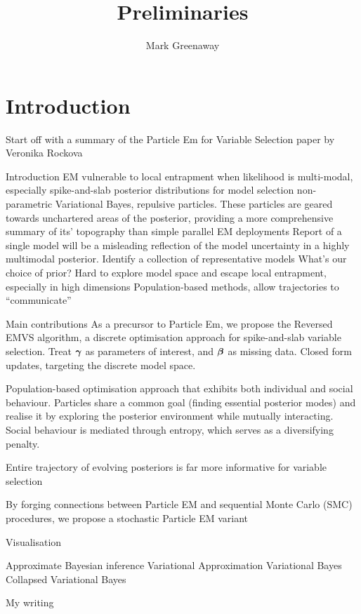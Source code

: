 \documentclass{amsart}[12pt]
\title{Preliminaries}
\author{Mark Greenaway}
\begin{document}
\setlength{\parindent}{0pt}
\maketitle

\section{Introduction}

Start off with a summary of the Particle Em for Variable Selection paper by Veronika Rockova

Introduction
EM vulnerable to local entrapment when likelihood is multi-modal, especially spike-and-slab posterior
distributions for model selection
non-parametric Variational Bayes, repulsive particles. These particles are geared towards unchartered areas of
the posterior, providing a more comprehensive summary of its' topography than simple parallel EM deployments
Report of a single model will be a misleading reflection of the model uncertainty in a highly multimodal
posterior. Identify a collection of representative models
What's our choice of prior?
Hard to explore model space and escape local entrapment, especially in high dimensions
Population-based methods, allow trajectories to ``communicate''

Main contributions
As a precursor to Particle Em, we propose the Reversed EMVS algorithm, a discrete optimisation approach for
spike-and-slab variable selection. Treat ${\boldsymbol \gamma}$ as parameters of interest, and ${\boldsymbol \beta}$ as missing data.
Closed form updates, targeting the discrete model space.

Population-based optimisation approach that exhibits both individual and social behaviour. Particles share a
common goal (finding essential posterior modes) and realise it by exploring the posterior environment while
mutually interacting. Social behaviour is mediated through entropy, which serves as a diversifying penalty.

Entire trajectory of evolving posteriors is far more informative for variable selection

By forging connections between Particle EM and sequential Monte Carlo (SMC) procedures, we propose a
stochastic Particle EM variant

Visualisation

Approximate Bayesian inference
Variational Approximation
Variational Bayes
Collapsed Variational Bayes

My writing
\end{document}
